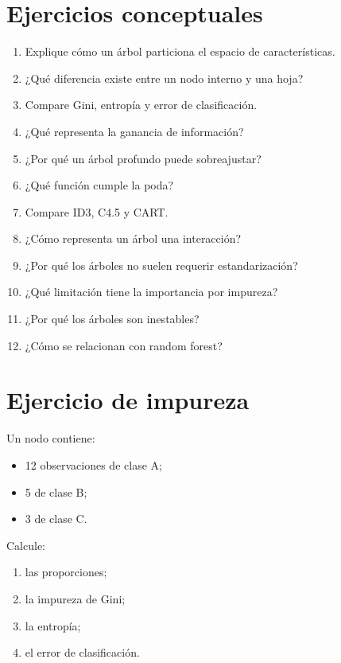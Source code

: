 \documentclass[
  spanish,
  11pt,
  letterpaper,
  DIV=11,
  numbers=noendperiod]{scrreprt}
\providecommand{\tightlist}{%
  \setlength{\itemsep}{0pt}\setlength{\parskip}{0pt}}
\theoremstyle{definition}
\theoremstyle{plain}
\theoremstyle{definition}
\theoremstyle{remark}
\begin{document}
\section{Ejercicios conceptuales}\label{ejercicios-conceptuales-12}

\begin{enumerate}
\def\labelenumi{\arabic{enumi}.}
\tightlist
\item
  Explique cómo un árbol particiona el espacio de características.
\item
  ¿Qué diferencia existe entre un nodo interno y una hoja?
\item
  Compare Gini, entropía y error de clasificación.
\item
  ¿Qué representa la ganancia de información?
\item
  ¿Por qué un árbol profundo puede sobreajustar?
\item
  ¿Qué función cumple la poda?
\item
  Compare ID3, C4.5 y CART.
\item
  ¿Cómo representa un árbol una interacción?
\item
  ¿Por qué los árboles no suelen requerir estandarización?
\item
  ¿Qué limitación tiene la importancia por impureza?
\item
  ¿Por qué los árboles son inestables?
\item
  ¿Cómo se relacionan con random forest?
\end{enumerate}

\section{Ejercicio de impureza}\label{ejercicio-de-impureza}

Un nodo contiene:

\begin{itemize}
\tightlist
\item
  12 observaciones de clase A;
\item
  5 de clase B;
\item
  3 de clase C.
\end{itemize}

Calcule:

\begin{enumerate}
\def\labelenumi{\arabic{enumi}.}
\tightlist
\item
  las proporciones;
\item
  la impureza de Gini;
\item
  la entropía;
\item
  el error de clasificación.
\end{enumerate}
\end{document}
